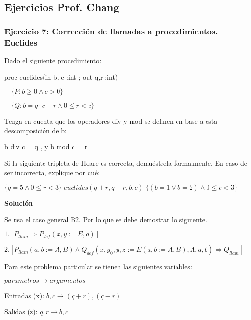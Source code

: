 \documentclass[hidelinks]{article}
\begin{document}
\newpage


\subsection{Ejercicios Prof. Chang}

\subsubsection{Ejercicio 7: Corrección de llamadas a procedimientos. Euclides}

Dado el siguiente procedimiento: \par

proc euclides(in b, c :int ; out q,r :int) \par
$\quad \{P: b \geq 0 \land c > 0\}$ \par
$\quad \{Q: b=q \cdot c + r \land 0 \leq r < c\}$ \par

Tenga en cuenta que los operadores div y mod se definen en base a esta
descomposición de b: \par

\begin{center}
	b div c = q , y b mod c = r
\end{center}

Si la siguiente tripleta de Hoare es correcta, demuéstrela formalmente. En caso
de ser incorrecta, explique por qué:\par

$\{ q = 5 \land 0 \leq r < 3 \} \; euclides(q + r, q - r, b, c) \; \{ (b = 1 \lor b = 2) \land 0 \leq c < 3 \}$ \par

\textbf{Solución}

Se usa el caso general B2. Por lo que se debe demostrar lo siguiente. \par

$1. [P_{llam} \Rightarrow P_{def}(x,y := E, a)]$ \par

$2. [P_{llam}(a,b := A, B) \land Q_{def}(x,y_0,y,z := E(a,b := A,B), A, a,b) \Rightarrow Q_{llam}]$ \par

Para este problema particular se tienen las siguientes variables: \par
\hspace{6em} $parametros \rightarrow argumentos$ \par
Entradas (x): $b,c \rightarrow (q+r), (q-r)$ \par
Salidas (z): $q,r \rightarrow b, c$ \par
\end{document}
